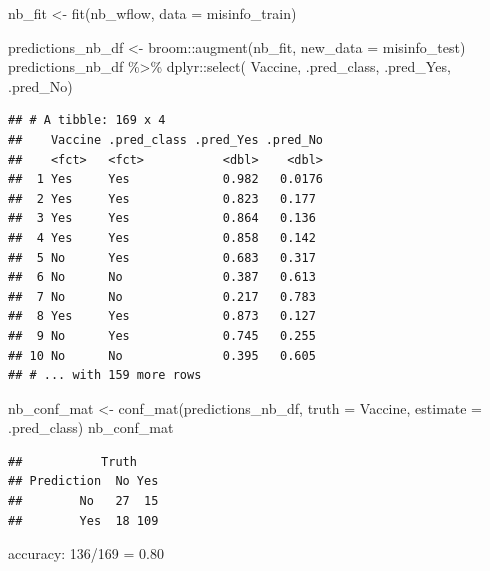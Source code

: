 \documentclass[
]{article}
\newenvironment{Shaded}{\begin{snugshade}}{\end{snugshade}}
\newcommand{\AttributeTok}[1]{\textcolor[rgb]{0.77,0.63,0.00}{#1}}
\newcommand{\FunctionTok}[1]{\textcolor[rgb]{0.00,0.00,0.00}{#1}}
\newcommand{\NormalTok}[1]{#1}
\newcommand{\OtherTok}[1]{\textcolor[rgb]{0.56,0.35,0.01}{#1}}
\newcommand{\SpecialCharTok}[1]{\textcolor[rgb]{0.00,0.00,0.00}{#1}}
\begin{document}
\begin{Shaded}
\begin{Highlighting}[]
\NormalTok{nb\_fit }\OtherTok{\textless{}{-}} \FunctionTok{fit}\NormalTok{(nb\_wflow, }\AttributeTok{data =}\NormalTok{ misinfo\_train)}
\end{Highlighting}
\end{Shaded}

\begin{Shaded}
\begin{Highlighting}[]
\NormalTok{predictions\_nb\_df }\OtherTok{\textless{}{-}}\NormalTok{ broom}\SpecialCharTok{::}\FunctionTok{augment}\NormalTok{(nb\_fit, }\AttributeTok{new\_data =}\NormalTok{ misinfo\_test)}
\NormalTok{predictions\_nb\_df }\SpecialCharTok{\%\textgreater{}\%}\NormalTok{ dplyr}\SpecialCharTok{::}\FunctionTok{select}\NormalTok{(}
\NormalTok{  Vaccine, }
\NormalTok{  .pred\_class, }
\NormalTok{  .pred\_Yes, }
\NormalTok{  .pred\_No)}
\end{Highlighting}
\end{Shaded}

\begin{verbatim}
## # A tibble: 169 x 4
##    Vaccine .pred_class .pred_Yes .pred_No
##    <fct>   <fct>           <dbl>    <dbl>
##  1 Yes     Yes             0.982   0.0176
##  2 Yes     Yes             0.823   0.177 
##  3 Yes     Yes             0.864   0.136 
##  4 Yes     Yes             0.858   0.142 
##  5 No      Yes             0.683   0.317 
##  6 No      No              0.387   0.613 
##  7 No      No              0.217   0.783 
##  8 Yes     Yes             0.873   0.127 
##  9 No      Yes             0.745   0.255 
## 10 No      No              0.395   0.605 
## # ... with 159 more rows
\end{verbatim}

\begin{Shaded}
\begin{Highlighting}[]
\NormalTok{nb\_conf\_mat }\OtherTok{\textless{}{-}} \FunctionTok{conf\_mat}\NormalTok{(predictions\_nb\_df, }\AttributeTok{truth =}\NormalTok{ Vaccine, }\AttributeTok{estimate =}\NormalTok{ .pred\_class)}
\NormalTok{nb\_conf\_mat}
\end{Highlighting}
\end{Shaded}

\begin{verbatim}
##           Truth
## Prediction  No Yes
##        No   27  15
##        Yes  18 109
\end{verbatim}

accuracy: 136/169 = 0.80
\end{document}
